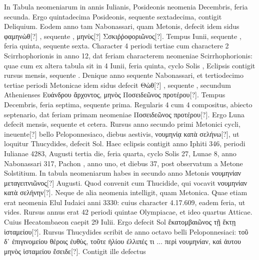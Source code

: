 
In Tabula neomeniarum in annis Iulianis, Posideonis neomenia 
Decembris, feria secunda.
Ergo quintadecima Posideonis, sequente
sextadecima, contigit Deliquium.
Eodem anno tam Nabonassari,
quam Metonis, defecit idem
 sidus \textgreek{φαμηνὼθ[?] },
 sequente \textgreek{}, \textgreek{μηνὺς[?]}
\textgreek{Σσκιῤῥοφοριῶνος[?]}.
Tempus  Iunii, sequente , feria quinta,
sequente sexta.
Character 4 periodi tertiae cum charactere
2 Scirrhophorionis in anno 12, dat feriam  characterem neomeniae
Scirrhophorionis: quae cum ex altera tabula sit in 4 Iunii, feria
quinta, cyclo Solis , Eclipsis contigit rursus  mensis, 
 sequente
.
Denique anno sequente Nabonassari, et tertiodecimo
tertiae periodi Metonicae idem sidus defecit
 \textgreek{Θὼθ[?] }, sequente
\textgreek{}, secundum Athenienses
 \textgreek{Ευάνδρου ἄρχοντος, μηνὸς Ποσειδεῶνος προτέρου[?]}.
Tempus  Decembris, feria septima, sequente prima.
Regularis
4 cum 4 compositus, abiecto septenario, dat feriam primam
neomeniae \textgreek{Ποσειδεῶνος προτέρου[?]}.
Ergo Luna defecit  mensis, sequente
 et cetera.
Rursus anno secundo primi Metonici cycli, ineuente[?]
bello Peloponnesiaco, diebus aestivis,
 \textgreek{νουμηνίᾳ κατὰ σελήνω[?]}, ut loquitur
Thucydides, defecit Sol.
Haec eclipsis contigit anno Iphiti 346, periodi
Iulianae 4283, Augusti tertia die, feria quarta, cyclo Solis 27, Lunae
8, anno Nabonassari 317, Pachon , anno uno, et diebus 37, post
observatum a Metone Solstitium.
In tabula neomeniarum habes
in secundo anno Metonis \textgreek{νουμηνίαν μεταγειτνιῶνος[?]}
  Augusti.
Quod
convenit cum Thucidide, qui vocavit \textgreek{νουμηνίαν κατὰ σελήνην[?]}.
Neque
de alia neomenia intelligit, quam Metonica.
Quae etiam erat neomenia
Elul Iudaici anni 3330: cuius character 4.17.609, eadem feria, ut
vides.
Rursus annus erat 42 periodi quintae Olympiacae, et ideo quartus
Atticae.
Cuius Hecatombaeon caepit 29 Iulii.
Ergo defecit Sol \textgreek{ἕκατομβαιῶνος
τῇ ἕκτῃ ἱσταμείου[?]}.
Rursus Thucydides scribit de anno octavo
belli Peloponnesiaci: \textgreek{τοῦ δ᾽ ἐπιγινομείου θέροις ἐυθὺς,
 τοῦτε ἡλίου ἐλλιπές τι
... περὶ νουμηνίαν, καὶ ἀυτου μηνὸς ἱσταμείου ἔσειδε[?]}.
Contigit ille defectus
